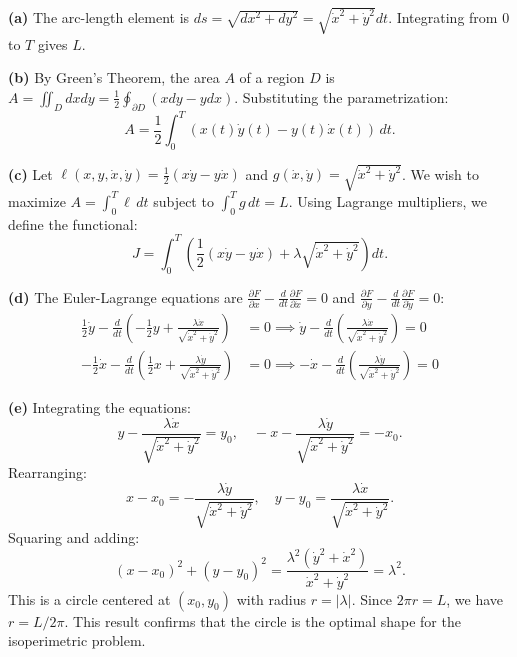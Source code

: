 \begin{solution}
\textbf{(a)} The arc-length element is $ds = \sqrt{dx^2 + dy^2} = \sqrt{\dot{x}^2 + \dot{y}^2} dt$. Integrating from $0$ to $T$ gives $L$.

\textbf{(b)} By Green's Theorem, the area $A$ of a region $D$ is $A = \iint_D dx dy = \frac{1}{2} \oint_{\partial D} (x dy - y dx)$. Substituting the parametrization:
\[
A = \frac{1}{2}\int_{0}^{T} (x(t) \dot{y}(t) - y(t) \dot{x}(t)) \, dt.
\]

\textbf{(c)} Let $\ell(x, y, \dot{x}, \dot{y}) = \frac{1}{2}(x\dot{y} - y\dot{x})$ and $g(\dot{x}, \dot{y}) = \sqrt{\dot{x}^2 + \dot{y}^2}$. We wish to maximize $A = \int_0^T \ell \, dt$ subject to $\int_0^T g \, dt = L$. Using Lagrange multipliers, we define the functional:
\[
J = \int_0^T \left( \frac{1}{2}(x\dot{y} - y\dot{x}) + \lambda \sqrt{\dot{x}^2 + \dot{y}^2} \right) dt.
\]

\textbf{(d)} The Euler-Lagrange equations are $\frac{\partial F}{\partial x} - \frac{d}{dt} \frac{\partial F}{\partial \dot{x}} = 0$ and $\frac{\partial F}{\partial y} - \frac{d}{dt} \frac{\partial F}{\partial \dot{y}} = 0$:
\begin{align*}
    \frac{1}{2}\dot{y} - \frac{d}{dt} \left( -\frac{1}{2}y + \frac{\lambda \dot{x}}{\sqrt{\dot{x}^2 + \dot{y}^2}} \right) &= 0 \implies \dot{y} - \frac{d}{dt} \left( \frac{\lambda \dot{x}}{\sqrt{\dot{x}^2 + \dot{y}^2}} \right) = 0 \\
    -\frac{1}{2}\dot{x} - \frac{d}{dt} \left( \frac{1}{2}x + \frac{\lambda \dot{y}}{\sqrt{\dot{x}^2 + \dot{y}^2}} \right) &= 0 \implies -\dot{x} - \frac{d}{dt} \left( \frac{\lambda \dot{y}}{\sqrt{\dot{x}^2 + \dot{y}^2}} \right) = 0
\end{align*}

\textbf{(e)} Integrating the equations:
\[
y - \frac{\lambda \dot{x}}{\sqrt{\dot{x}^2 + \dot{y}^2}} = y_0, \quad -x - \frac{\lambda \dot{y}}{\sqrt{\dot{x}^2 + \dot{y}^2}} = -x_0.
\]
Rearranging:
\[
x - x_0 = -\frac{\lambda \dot{y}}{\sqrt{\dot{x}^2 + \dot{y}^2}}, \quad y - y_0 = \frac{\lambda \dot{x}}{\sqrt{\dot{x}^2 + \dot{y}^2}}.
\]
Squaring and adding:
\[
(x - x_0)^2 + (y - y_0)^2 = \frac{\lambda^2 (\dot{y}^2 + \dot{x}^2)}{\dot{x}^2 + \dot{y}^2} = \lambda^2.
\]
This is a circle centered at $(x_0, y_0)$ with radius $r = |\lambda|$. Since $2\pi r = L$, we have $r = L/2\pi$. This result confirms that the circle is the optimal shape for the isoperimetric problem.
\end{solution}

